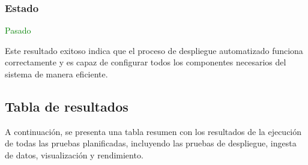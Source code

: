 \subsubsection{Estado} \textcolor{green}{Pasado}

Este resultado exitoso indica que el proceso de despliegue automatizado
funciona correctamente y es capaz de configurar todos los componentes
necesarios del sistema de manera eficiente.


\newpage{}
\subsection{Tabla de resultados}
A continuación, se presenta una tabla resumen con los resultados de la
ejecución de todas las pruebas planificadas, incluyendo las pruebas de
despliegue, ingesta de datos, visualización y rendimiento.

